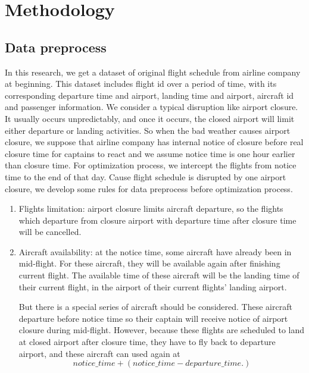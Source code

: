 \documentclass[senior]{IPSstyle}
\begin{document}
\chapter{Methodology} \label{methodology}

\section{Data preprocess}

In this research, we get a dataset of original flight schedule from airline company at beginning.
This dataset includes flight id over a period of time, with its corresponding departure time and airport, landing time and airport, aircraft id and passenger information.
We consider a typical disruption like airport closure. 
It usually occurs unpredictably, and once it occurs, the closed airport will limit either departure or landing activities.
So when the bad weather causes airport closure, we suppose that airline company has internal notice of closure before real closure time for captains to react and we assume notice time is one hour earlier than closure time.
For optimization process, we intercept the flights from notice time to the end of that day.
Cause flight schedule is disrupted by one airport closure, we develop some rules for data preprocess before optimization process.
\begin{enumerate}
    \item Flights limitation: airport closure limits aircraft departure, so the flights which departure from closure airport with departure time after closure time will be cancelled.
    \item Aircraft availability: at the notice time, some aircraft have already been in mid-flight. For these aircraft, they will be available again after finishing current flight. The available time of these aircraft will be the landing time of their current flight, in the airport of their current flights’ landing airport.
    
    But there is a special series of aircraft should be considered. These aircraft departure before notice time so their captain will receive notice of airport closure during mid-flight. However, because these flights are scheduled to land at closed airport after closure time, they have to fly back to departure airport, and these aircraft can used again at 
    \begin{equation*}
    notice\_time+(notice\_time-departure\_time.)    
    \end{equation*}
\end{enumerate}
\end{document}
